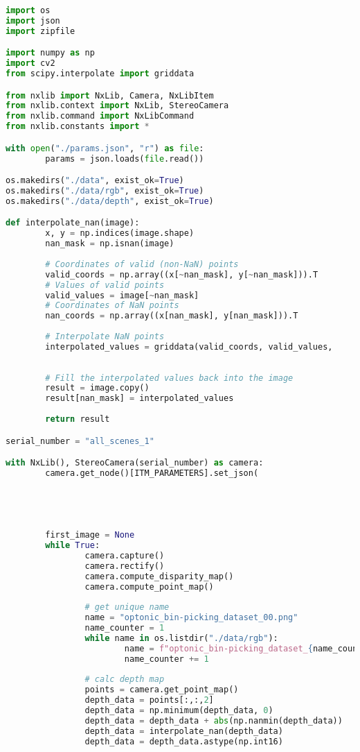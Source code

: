 	\clearpage
	\begin{lstlisting}[language=Python,caption=Capturing images from a file camera with depth image scaling using Ensenso Software from Optonic GmbH \cite{optonic}, label=lst:file-camera]
import os
import json
import zipfile

import numpy as np
import cv2
from scipy.interpolate import griddata

from nxlib import NxLib, Camera, NxLibItem
from nxlib.context import NxLib, StereoCamera
from nxlib.command import NxLibCommand
from nxlib.constants import *

with open("./params.json", "r") as file:
		params = json.loads(file.read())

os.makedirs("./data", exist_ok=True)
os.makedirs("./data/rgb", exist_ok=True)
os.makedirs("./data/depth", exist_ok=True)

def interpolate_nan(image):
		x, y = np.indices(image.shape)
		nan_mask = np.isnan(image)
		
		# Coordinates of valid (non-NaN) points
		valid_coords = np.array((x[~nan_mask], y[~nan_mask])).T
		# Values of valid points
		valid_values = image[~nan_mask]
		# Coordinates of NaN points
		nan_coords = np.array((x[nan_mask], y[nan_mask])).T
		
		# Interpolate NaN points
		interpolated_values = griddata(valid_coords, valid_values,
																				nan_coords, method='linear')
		
		# Fill the interpolated values back into the image
		result = image.copy()
		result[nan_mask] = interpolated_values
		
		return result

serial_number = "all_scenes_1"

with NxLib(), StereoCamera(serial_number) as camera:
		camera.get_node()[ITM_PARAMETERS].set_json(
																					json.dumps(params[ITM_PARAMETERS]), 
																					True
																				)
		
		
		first_image = None
		while True:
				camera.capture()
				camera.rectify()
				camera.compute_disparity_map()
				camera.compute_point_map()
				
				# get unique name
				name = "optonic_bin-picking_dataset_00.png"
				name_counter = 1
				while name in os.listdir("./data/rgb"):
						name = f"optonic_bin-picking_dataset_{name_counter:02}.png"
						name_counter += 1
				
				# calc depth map
				points = camera.get_point_map()
				depth_data = points[:,:,2]
				depth_data = np.minimum(depth_data, 0)
				depth_data = depth_data + abs(np.nanmin(depth_data))
				depth_data = interpolate_nan(depth_data)
				depth_data = depth_data.astype(np.int16)
				

\end{lstlisting}
